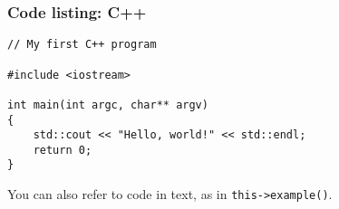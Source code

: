 \documentclass[xcolor={dvipsnames}]{beamer}\usepackage{etoolbox}\newtoggle{printable}\togglefalse{printable}
\begin{document}
\begin{frame}[fragile]
	\frametitle{Code listing: C++}
	\begin{lstlisting}
// My first C++ program

#include <iostream>

int main(int argc, char** argv)
{
    std::cout << "Hello, world!" << std::endl;
    return 0;
}
	\end{lstlisting}
	
	You can also refer to code in text, as in \lstinline{this->example()}.
\end{frame}
\end{document}
